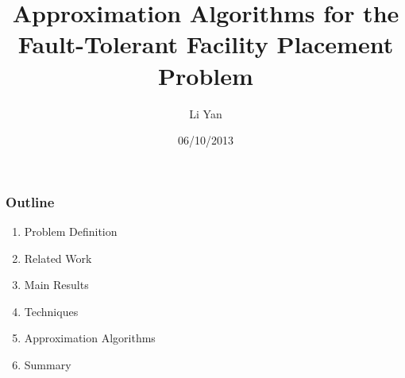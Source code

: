 \documentclass[hyperref,dvipsnames,svgnames]{beamer}
\title[FTFP]{Approximation Algorithms
  for the Fault-Tolerant Facility Placement Problem}
\author[lyan]{Li Yan}
\institute[UCR]{
  Computer Science\\
  University of California Riverside\\
}
\date{06/10/2013}
\begin{document}
\begin{frame}
  \titlepage
\end{frame}

\begin{frame}
  \frametitle{Outline}
  \begin{enumerate}
    
  \item Problem Definition

  \item Related Work

  \item Main Results

  \item Techniques

  \item Approximation Algorithms

  \item{Summary}
  \end{enumerate}
\end{frame}

\end{document}

